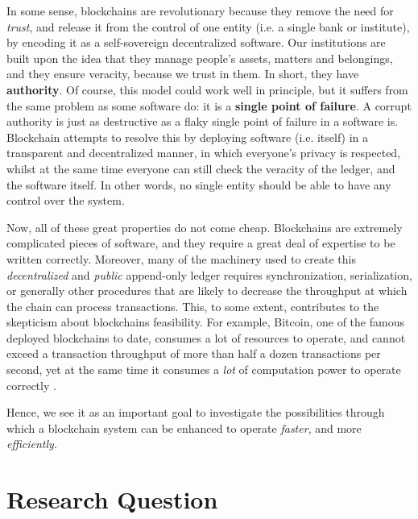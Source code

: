 In some sense, blockchains are revolutionary because they remove the need for \textit{trust}, and
release it from the control of one entity (i.e. a single bank or institute), by encoding it as a
self-sovereign decentralized software. Our institutions are built upon the idea that they manage
people's assets, matters and belongings, and they ensure veracity, because we trust in them. In
short, they have \textbf{authority}. Of course, this model could work well in principle, but it
suffers from the same problem as some software do: it is a \textbf{single point of failure}. A
corrupt authority is just as destructive as a flaky single point of failure in a software is.
Blockchain attempts to resolve this by deploying software (i.e. itself) in a transparent and
decentralized manner, in which everyone's privacy is respected, whilst at the same time everyone can
still check the veracity of the ledger, and the software itself. In other words, no single entity
should be able to have any control over the system.

Now, all of these great properties do not come cheap. Blockchains are extremely complicated
pieces of software, and they require a great deal of expertise to be written correctly. Moreover,
many of the machinery used to create this \textit{decentralized} and \textit{public} append-only
ledger requires synchronization, serialization, or generally other procedures that are likely to decrease the throughput at which the chain can process transactions. This, to some extent, contributes
to the skepticism about blockchains feasibility. For example, Bitcoin, one of the
famous deployed blockchains to date, consumes a lot of resources to operate, and cannot exceed a
transaction throughput of more than half a dozen transactions per second, yet at the same time it
consumes a \textit{lot} of computation power to operate correctly \cite{security_of_bitcoin}.

Hence, we see it as an important goal to investigate the possibilities through which a blockchain
system can be enhanced to operate \textit{faster}, and more \textit{efficiently}.

\section{Research Question} \label{chap_intro:sec:resarch_q}

